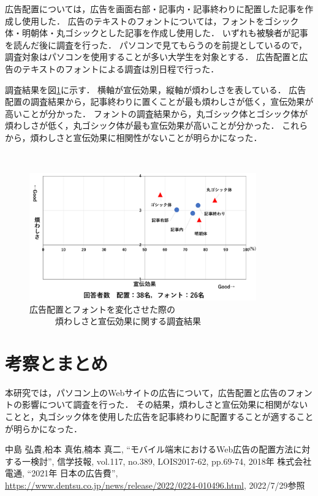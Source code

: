 \documentclass[twocolumn,10pt,a4j]{ltjsarticle}
\begin{document}
広告配置については，広告を画面右部・記事内・記事終わりに配置した記事を作成し使用した．
広告のテキストのフォントについては，フォントをゴシック体・明朝体・丸ゴシックとした記事を作成し使用した．
いずれも被験者が記事を読んだ後に調査を行った．
パソコンで見てもらうのを前提としているので，調査対象はパソコンを使用することが多い大学生を対象とする．
広告配置と広告のテキストのフォントによる調査は別日程で行った．

調査結果を図\ref{fig:結果}に示す．
横軸が宣伝効果，縦軸が煩わしさを表している．
広告配置の調査結果から，記事終わりに置くことが最も煩わしさが低く，宣伝効果が高いことが分かった．
フォントの調査結果から，丸ゴシック体とゴシック体が煩わしさが低く，丸ゴシック体が最も宣伝効果が高いことが分かった．
これらから，煩わしさと宣伝効果に相関性がないことが明らかになった．

　
\begin{figure}[h]
\begin{center}
 \includegraphics[height=55mm]{結果.pdf}
\end{center}
 \caption{広告配置とフォントを変化させた際の\\　　　煩わしさと宣伝効果に関する調査結果}
 \label{fig:結果}
\end{figure}

\section{考察とまとめ}
本研究では，パソコン上のWebサイトの広告について，広告配置と広告のフォントの影響について調査を行った．
その結果，煩わしさと宣伝効果に相関がないことと，丸ゴシック体を使用した広告を記事終わりに配置することが適することが明らかになった．


\begin{thebibliography}{99}
 中島 弘貴,柗本 真佑,楠本 真二, ``モバイル端末におけるWeb広告の配置方法に対する一検討'', 信学技報, vol.117, no.389, LOIS2017-62, pp.69-74, 2018年
 株式会社電通, ``2021年 日本の広告費'', \url{https://www.dentsu.co.jp/news/release/2022/0224-010496.html}, 2022/7/29参照
\end{thebibliography}
\end{document}
